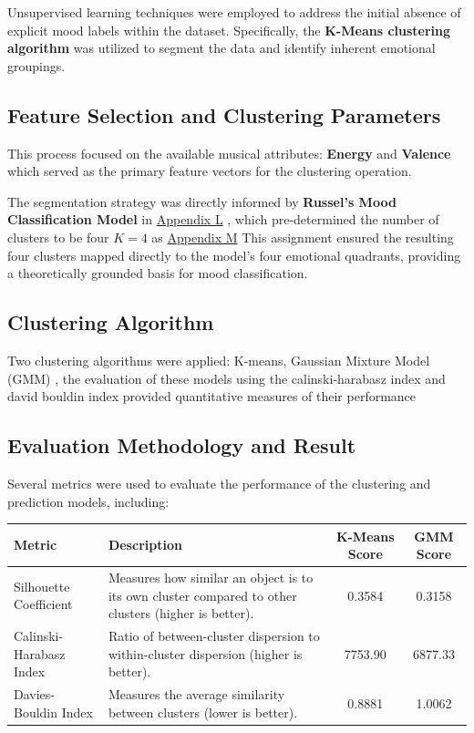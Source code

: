 \documentclass{article}
\begin{document}
{{{{{{{Unsupervised learning techniques were employed to address the initial absence of explicit mood labels within the dataset. Specifically, the \textbf{K-Means clustering algorithm} was utilized to segment the data and identify inherent emotional groupings.

\subsection{Feature Selection and Clustering Parameters}

This process focused on the available musical attributes: \textbf{Energy} and \textbf{Valence} which served as the primary feature vectors for the clustering operation.

The segmentation strategy was directly informed by \textbf{Russel's Mood Classification Model} in \hyperref[fig:russel_model]{Appendix L}
\cite{russell1980circumplex}, which pre-determined the number of clusters to be four $K=4$  as \hyperref[fig:elbow]{Appendix M} 
This assignment ensured the resulting four clusters mapped directly to the model's four emotional quadrants, providing a theoretically grounded basis for mood classification.
\subsection{Clustering Algorithm }




Two clustering algorithms were applied: K-means, Gaussian Mixture Model (GMM) , the evaluation of these models using the calinski-harabasz index and david bouldin index provided quantitative measures of their performance 


\subsection{Evaluation Methodology and Result}

Several metrics were used to evaluate the performance of the clustering and prediction models, including:

\begin{tabular}{|l|p{6cm}|c|c|}
\hline
\textbf{Metric} & \textbf{Description} & \textbf{K-Means Score} & \textbf{GMM Score} \\
\hline
Silhouette Coefficient & Measures how similar an object is to its own cluster compared to other clusters (higher is better). & 0.3584 & 0.3158 \\
\hline
Calinski-Harabasz Index & Ratio of between-cluster dispersion to within-cluster dispersion (higher is better). & 7753.90 & 6877.33 \\
\hline
Davies-Bouldin Index & Measures the average similarity between clusters (lower is better). & 0.8881 & 1.0062 \\
\hline
\end{tabular}

}}}}}}}
\end{document}

